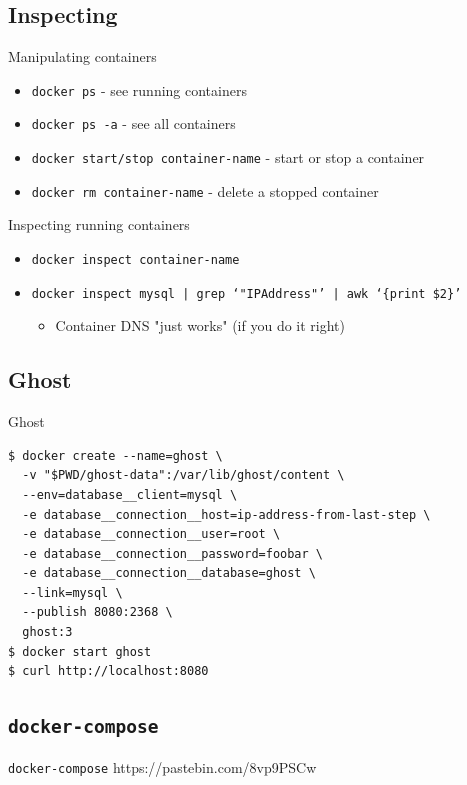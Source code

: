 \documentclass{beamer}
\begin{document}
\subsection{Inspecting}
\begin{frame}{Manipulating containers}
    \begin{itemize}
        \item \texttt{docker ps} - see running containers
        \item \texttt{docker ps -a} - see all containers
        \item \texttt{docker start/stop container-name} - start or stop a container
        \item \texttt{docker rm container-name} - delete a stopped container
    \end{itemize}
\end{frame}

\begin{frame}{Inspecting running containers}
   \begin{itemize}
       \item \texttt{docker inspect container-name}
       \item \texttt{docker inspect mysql | grep `"IPAddress"' | awk `\{print \$2\}'}
       \begin{itemize}
           \item Container DNS "just works" (if you do it right)
       \end{itemize}
   \end{itemize}
\end{frame}

\subsection{Ghost}
\begin{frame}[fragile]{Ghost}
\begin{lstlisting}
$ docker create --name=ghost \
  -v "$PWD/ghost-data":/var/lib/ghost/content \
  --env=database__client=mysql \
  -e database__connection__host=ip-address-from-last-step \
  -e database__connection__user=root \
  -e database__connection__password=foobar \
  -e database__connection__database=ghost \
  --link=mysql \
  --publish 8080:2368 \
  ghost:3
$ docker start ghost
$ curl http://localhost:8080
\end{lstlisting}
\end{frame}

\subsection{\texttt{docker-compose}}
\begin{frame}[fragile]{\texttt{docker-compose}}
https://pastebin.com/8vp9PSCw
\end{frame}
\end{document}

